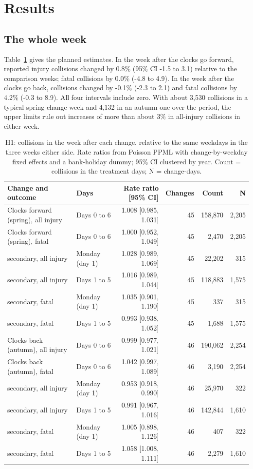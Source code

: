 \documentclass[11pt,a4paper]{article}
\begin{document}
\section{Results}\label{sec:results}
\subsection{The whole week}
Table~\ref{tab:h1} gives the planned estimates. In the week after the clocks go forward, reported injury collisions changed by 0.8\% (95\% CI -1.5 to 3.1) relative to the comparison weeks; fatal collisions by 0.0\% (-4.8 to 4.9). In the week after the clocks go back, collisions changed by -0.1\% (-2.3 to 2.1) and fatal collisions by 4.2\% (-0.3 to 8.9). All four intervals include zero. With about 3,530 collisions in a typical spring change week and 4,132 in an autumn one over the period, the upper limits rule out increases of more than about 3\% in all-injury collisions in either week.

\begin{table}[tbp]\centering\footnotesize\caption{H1: collisions in the week after each change, relative to the same weekdays in the three weeks either side. Rate ratios from Poisson PPML with change-by-weekday fixed effects and a bank-holiday dummy; 95\% CI clustered by year. Count = collisions in the treatment days; N = change-days.}\label{tab:h1}\begin{tabular}{llrrrr}\toprule Change and outcome & Days & Rate ratio [95\% CI] & Changes & Count & N\\\midrule
Clocks forward (spring), all injury & Days 0 to 6 & 1.008 [0.985, 1.031] & 45 & 158,870 & 2,205\\
Clocks forward (spring), fatal & Days 0 to 6 & 1.000 [0.952, 1.049] & 45 & 2,470 & 2,205\\
\quad secondary, all injury & Monday (day 1) & 1.028 [0.989, 1.069] & 45 & 22,202 & 315\\
\quad secondary, all injury & Days 1 to 5 & 1.016 [0.989, 1.044] & 45 & 118,883 & 1,575\\
\quad secondary, fatal & Monday (day 1) & 1.035 [0.901, 1.190] & 45 & 337 & 315\\
\quad secondary, fatal & Days 1 to 5 & 0.993 [0.938, 1.052] & 45 & 1,688 & 1,575\\
\midrule
Clocks back (autumn), all injury & Days 0 to 6 & 0.999 [0.977, 1.021] & 46 & 190,062 & 2,254\\
Clocks back (autumn), fatal & Days 0 to 6 & 1.042 [0.997, 1.089] & 46 & 3,190 & 2,254\\
\quad secondary, all injury & Monday (day 1) & 0.953 [0.918, 0.990] & 46 & 25,970 & 322\\
\quad secondary, all injury & Days 1 to 5 & 0.991 [0.967, 1.016] & 46 & 142,844 & 1,610\\
\quad secondary, fatal & Monday (day 1) & 1.005 [0.898, 1.126] & 46 & 407 & 322\\
\quad secondary, fatal & Days 1 to 5 & 1.058 [1.008, 1.111] & 46 & 2,279 & 1,610\\\bottomrule\end{tabular}\end{table}
\end{document}
